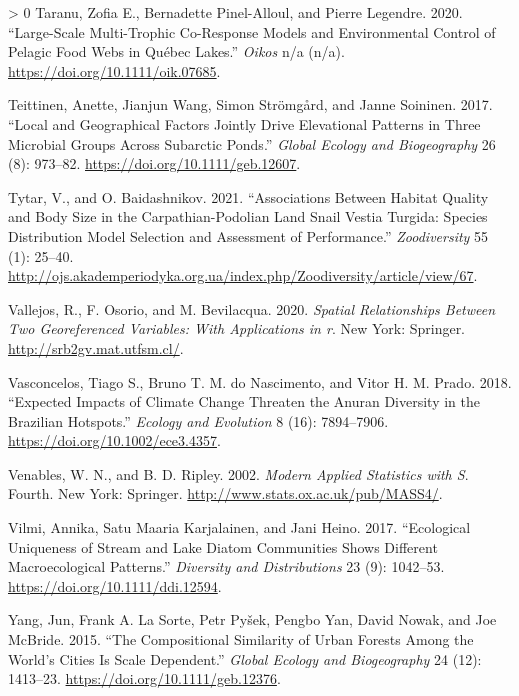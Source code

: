 \documentclass[11pt]{article}
\newlength{\cslhangindent}
\newenvironment{CSLReferences}[3] %
 {%
  \setlength{\parindent}{0pt}
  \ifodd #1 \everypar{\setlength{\hangindent}{\cslhangindent}}\ignorespaces\fi
  \ifnum #2 > 0
  \setlength{\parskip}{#2\baselineskip}
  \fi
 }%
 {}
\begin{document}
\begin{CSLReferences}{1}{0}
\leavevmode\hypertarget{ref-Taranu2020LarMul}{}%
Taranu, Zofia E., Bernadette Pinel-Alloul, and Pierre Legendre. 2020.
{``Large-Scale Multi-Trophic Co-Response Models and Environmental
Control of Pelagic Food Webs in Québec Lakes.''} \emph{Oikos} n/a (n/a).
\url{https://doi.org/10.1111/oik.07685}.

\leavevmode\hypertarget{ref-Teittinen2017LocGeo}{}%
Teittinen, Anette, Jianjun Wang, Simon Strömgård, and Janne Soininen.
2017. {``Local and Geographical Factors Jointly Drive Elevational
Patterns in Three Microbial Groups Across Subarctic Ponds.''}
\emph{Global Ecology and Biogeography} 26 (8): 973--82.
\url{https://doi.org/10.1111/geb.12607}.

\leavevmode\hypertarget{ref-Tytar2021AssHab}{}%
Tytar, V., and O. Baidashnikov. 2021. {``Associations Between Habitat
Quality and Body Size in the Carpathian-Podolian Land Snail Vestia
Turgida: Species Distribution Model Selection and Assessment of
Performance.''} \emph{Zoodiversity} 55 (1): 25--40.
\url{http://ojs.akademperiodyka.org.ua/index.php/Zoodiversity/article/view/67}.

\leavevmode\hypertarget{ref-Vallejos2020SpaRel}{}%
Vallejos, R., F. Osorio, and M. Bevilacqua. 2020. \emph{Spatial
Relationships Between Two Georeferenced Variables: With Applications in
r}. New York: Springer. \url{http://srb2gv.mat.utfsm.cl/}.

\leavevmode\hypertarget{ref-Vasconcelos2018ExpImp}{}%
Vasconcelos, Tiago S., Bruno T. M. do Nascimento, and Vitor H. M. Prado.
2018. {``Expected Impacts of Climate Change Threaten the Anuran
Diversity in the Brazilian Hotspots.''} \emph{Ecology and Evolution} 8
(16): 7894--7906. \url{https://doi.org/10.1002/ece3.4357}.

\leavevmode\hypertarget{ref-Venables2002ModApp}{}%
Venables, W. N., and B. D. Ripley. 2002. \emph{Modern Applied Statistics
with S}. Fourth. New York: Springer.
\url{http://www.stats.ox.ac.uk/pub/MASS4/}.

\leavevmode\hypertarget{ref-Vilmi2017EcoUni}{}%
Vilmi, Annika, Satu Maaria Karjalainen, and Jani Heino. 2017.
{``Ecological Uniqueness of Stream and Lake Diatom Communities Shows
Different Macroecological Patterns.''} \emph{Diversity and
Distributions} 23 (9): 1042--53.
\url{https://doi.org/10.1111/ddi.12594}.

\leavevmode\hypertarget{ref-Yang2015ComSim}{}%
Yang, Jun, Frank A. La Sorte, Petr Pyšek, Pengbo Yan, David Nowak, and
Joe McBride. 2015. {``The Compositional Similarity of Urban Forests
Among the World's Cities Is Scale Dependent.''} \emph{Global Ecology and
Biogeography} 24 (12): 1413--23.
\url{https://doi.org/10.1111/geb.12376}.


\end{CSLReferences}
\end{document}
